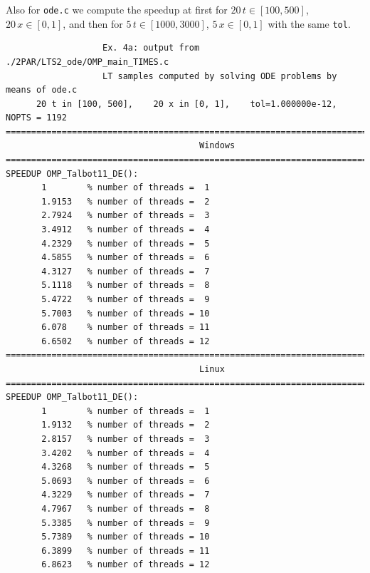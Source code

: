 \documentclass[a4paper,10pt]{report}%
\begin{document}
\newpage
\noindent Also for {\tt ode.c} we compute the speedup at first for $20\,t\in[100,500]$, $20\,x\in[0,1]$,
and then for $5\,t\in[1000,3000]$, $5\,x\in[0,1]$ with the same {\tt tol}.
\begin{lstlisting}
                   Ex. 4a: output from ./2PAR/LTS2_ode/OMP_main_TIMES.c
                   LT samples computed by solving ODE problems by means of ode.c
      20 t in [100, 500],    20 x in [0, 1],    tol=1.000000e-12,    NOPTS = 1192
====================================================================================
                                      Windows
====================================================================================
SPEEDUP OMP_Talbot11_DE():
       1        % number of threads =  1
       1.9153   % number of threads =  2
       2.7924   % number of threads =  3
       3.4912   % number of threads =  4
       4.2329   % number of threads =  5
       4.5855   % number of threads =  6
       4.3127   % number of threads =  7
       5.1118   % number of threads =  8
       5.4722   % number of threads =  9
       5.7003   % number of threads = 10
       6.078    % number of threads = 11
       6.6502   % number of threads = 12
====================================================================================
                                      Linux
====================================================================================
SPEEDUP OMP_Talbot11_DE():
       1        % number of threads =  1
       1.9132   % number of threads =  2
       2.8157   % number of threads =  3
       3.4202   % number of threads =  4
       4.3268   % number of threads =  5
       5.0693   % number of threads =  6
       4.3229   % number of threads =  7
       4.7967   % number of threads =  8
       5.3385   % number of threads =  9
       5.7389   % number of threads = 10
       6.3899   % number of threads = 11
       6.8623   % number of threads = 12


\end{lstlisting}
\end{document}
